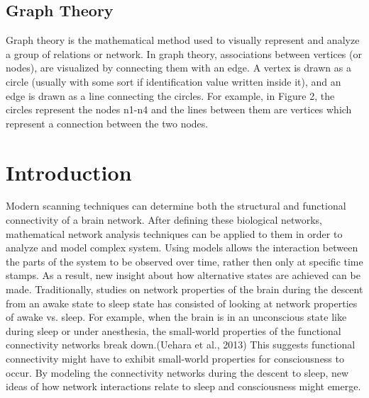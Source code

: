 \documentclass[12pt,letterpaper]{report}
\begin{document}
\section{Graph Theory}
        Graph theory is the mathematical method used to visually represent and analyze a group of relations or network. In graph theory, associations between vertices (or nodes), are visualized by connecting them with an edge. A vertex is drawn as a circle (usually with some sort if identification value written inside it), and an edge is drawn as a line connecting the circles. For example, in Figure 2, the circles represent the nodes n1-n4 and the lines between them are vertices which represent a connection between the two nodes.
\chapter{Introduction}
        Modern scanning techniques can determine both the structural and functional connectivity of a brain network. After defining these biological networks, mathematical network analysis techniques can be applied to them in order to analyze and model complex system. Using models allows the interaction between the parts of the system to be observed over time, rather then only at specific time stamps. As a result, new insight about how alternative states are achieved can be made. Traditionally, studies on network properties of the brain during the descent from an awake state to sleep state has consisted of looking at network properties of awake vs. sleep. For example, when the brain is in an unconscious state like during sleep or under anesthesia, the small-world properties of the functional connectivity networks break down.(Uehara et al., 2013) This suggests functional connectivity might have to exhibit small-world properties for consciousness to occur. By modeling the connectivity networks during the descent to sleep, new ideas of how network interactions relate to sleep and consciousness might emerge.
\end{document}
